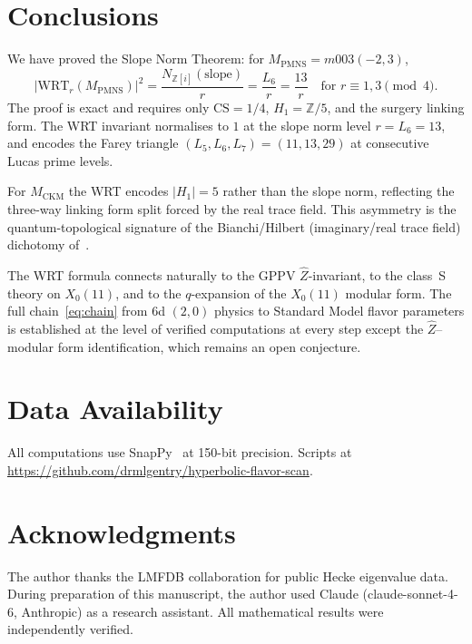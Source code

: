 \documentclass[11pt,a4paper]{article}
\theoremstyle{definition}
\newcommand{\MPMNS}{M_{\mathrm{PMNS}}}
\newcommand{\MCKM}{M_{\mathrm{CKM}}}
\newcommand{\Zfive}{\mathbb{Z}/5}
\newcommand{\Zi}{\mathbb{Z}[i]}
\newcommand{\WRT}{\mathrm{WRT}}
\newcommand{\CS}{\mathrm{CS}}
\begin{document}
\section{Conclusions}
\label{sec:conclusions}

We have proved the Slope Norm Theorem: for $\MPMNS = m003(-2,3)$,
\[
|\WRT_r(\MPMNS)|^2 = \frac{N_{\Zi}(\text{slope})}{r}
= \frac{L_6}{r} = \frac{13}{r}
\quad\text{for } r \equiv 1,3 \pmod 4.
\]
The proof is exact and requires only $\CS = 1/4$, $H_1 = \Zfive$,
and the surgery linking form.
The WRT invariant normalises to $1$ at the slope norm level $r = L_6 = 13$,
and encodes the Farey triangle $(L_5, L_6, L_7) = (11, 13, 29)$ at
consecutive Lucas prime levels.

For $\MCKM$ the WRT encodes $|H_1| = 5$ rather than the slope norm,
reflecting the three-way linking form split forced by the real trace field.
This asymmetry is the quantum-topological signature of the
Bianchi/Hilbert (imaginary/real trace field) dichotomy of~\cite{Gentry:X011}.

The WRT formula connects naturally to the GPPV $\hat{Z}$-invariant, to
the class~S theory on $X_0(11)$, and to the $q$-expansion of the $X_0(11)$
modular form.
The full chain~\eqref{eq:chain} from 6d $(2,0)$ physics to Standard Model
flavor parameters is established at the level of verified computations
at every step except the $\hat{Z}$--modular form identification,
which remains an open conjecture.

\section*{Data Availability}
All computations use SnapPy~\cite{SnapPy} at 150-bit precision.
Scripts at \url{https://github.com/drmlgentry/hyperbolic-flavor-scan}.

\section*{Acknowledgments}
The author thanks the LMFDB collaboration for public Hecke eigenvalue data.
During preparation of this manuscript, the author used Claude
(claude-sonnet-4-6, Anthropic) as a research assistant.
All mathematical results were independently verified.
\end{document}
